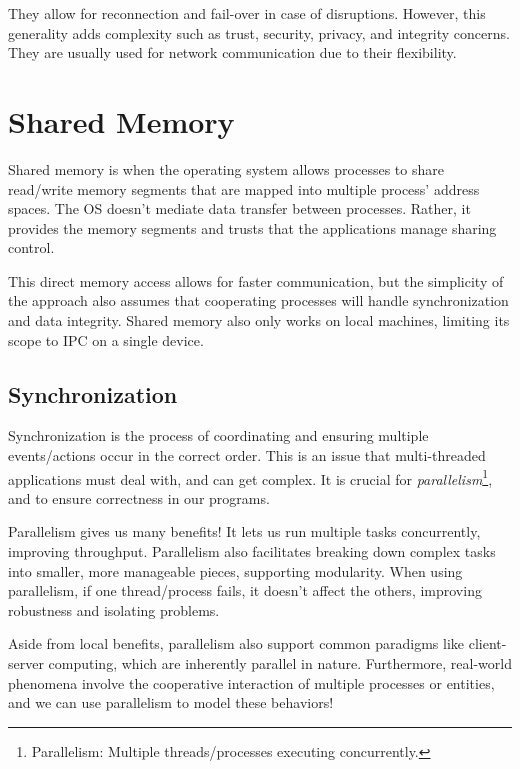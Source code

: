 \documentclass{report}
\newcommand{\asideBegin}[1]{\begin{tcolorbox}[colback=orange!5!white,colframe=black!75!orange,title={Aside:
      #1}]}
\newcommand{\asideEnd}{\end{tcolorbox}}
\begin{document}
They allow for reconnection and fail-over in case of disruptions. However, this generality adds
complexity such as trust, security, privacy, and integrity concerns. They are usually used for
network communication due to their flexibility.





\section{Shared Memory}
Shared memory is when the operating system allows processes to share read/write memory segments that
are mapped into multiple process' address spaces. The OS doesn't mediate data transfer between
processes. Rather, it provides the memory segments and trusts that the applications manage sharing
control.

This direct memory access allows for faster communication, but the simplicity of the approach also
assumes that cooperating processes will handle synchronization and data integrity. Shared memory
also only works on local machines, limiting its scope to IPC on a single device.


\subsection{Synchronization}
Synchronization is the process of coordinating and ensuring multiple events/actions occur in the
correct order. This is an issue that multi-threaded applications must deal with, and can get
complex. It is crucial for \textit{parallelism}\footnote{Parallelism: Multiple threads/processes executing
  concurrently.}, and to ensure correctness in our programs. 


\asideBegin{Parallelism}
Parallelism gives us many benefits! It lets us run multiple tasks concurrently, improving
throughput. Parallelism also facilitates breaking down complex tasks into smaller, more manageable
pieces, supporting modularity. When using parallelism, if one thread/process fails, it doesn't
affect the others, improving robustness and isolating problems.

Aside from local benefits, parallelism also support common paradigms like client-server computing,
which are inherently parallel in nature. Furthermore, real-world phenomena involve the cooperative
interaction of multiple processes or entities, and we can use parallelism to model these behaviors!
\asideEnd
\end{document}
